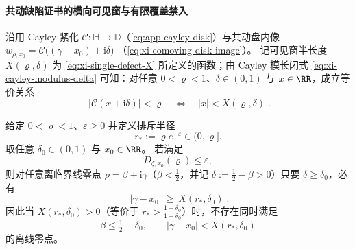 \paragraph{共动缺陷证书的横向可见窗与有限覆盖禁入}\label{par:xi-comoving-transverse-window-band-exclusion}
沿用 Cayley 紧化 \(\mathcal{C}:\mathbb{H}\to\mathbb{D}\)（\eqref{eq:app-cayley-disk}）与共动盘内像
\(
w_{\rho,x_0}=\mathcal{C}\bigl((\gamma-x_0)+\mathrm{i}\delta\bigr)
\)
（\eqref{eq:xi-comoving-disk-image}）。
记可见窗半长度 \(X(\varrho,\delta)\) 为 \eqref{eq:xi-single-defect-X} 所定义的函数；由 Cayley 模长闭式 \eqref{eq:xi-cayley-modulus-delta} 可知：对任意 \(0<\varrho<1\)、\(\delta\in(0,1)\) 与 \(x\in\RR\)，成立等价关系
\begin{equation}\label{eq:xi-transverse-visible-window-equivalence}
\boxed{\;
\bigl|\mathcal{C}(x+\mathrm{i}\delta)\bigr|<\varrho
\quad\Longleftrightarrow\quad
|x|<X(\varrho,\delta)\; }.
\end{equation}

\begin{theorem}\label{thm:xi-comoving-defect-transverse-visible-window}
给定 \(0<\varrho<1\)、\(\varepsilon\ge 0\) 并定义排斥半径
\[
r_\ast:=\varrho e^{-\varepsilon}\in(0,\varrho].
\]
取任意 \(\delta_0\in(0,1)\) 与 \(x_0\in\RR\)。
若满足
\[
D_{\zeta,x_0}(\varrho)\le \varepsilon,
\]
则对任意离临界线零点 \(\rho=\beta+\mathrm{i}\gamma\)（\(\beta<\tfrac12\)，并记 \(\delta:=\tfrac12-\beta>0\)）只要 \(\delta\ge\delta_0\)，必有
\begin{equation}\label{eq:xi-transverse-window-separation}
\boxed{\;
|\gamma-x_0|\ \ge\ X(r_\ast,\delta_0)\; }.
\end{equation}
因此当 \(X(r_\ast,\delta_0)>0\)（等价于 \(r_\ast>\frac{1-\delta_0}{1+\delta_0}\)）时，不存在同时满足
\[
\beta\le\tfrac12-\delta_0,
\qquad
|\gamma-x_0|<X(r_\ast,\delta_0)
\]
的离线零点。
\end{theorem}

